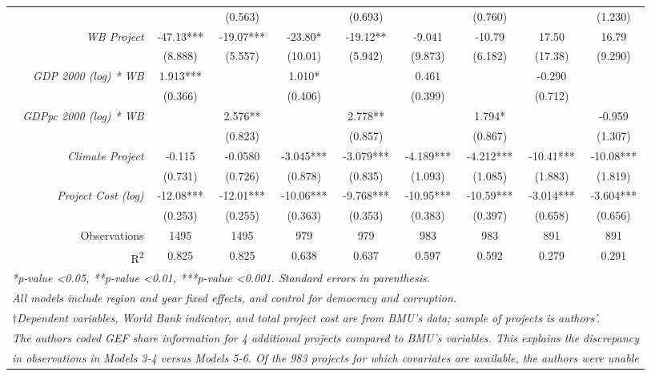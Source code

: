 \documentclass{article}
\begin{document}
\begin{singlespace}
\begin{table}[H]
{\begin{tabular}{rcccccccc}
			\textit{} &  & (0.563) &  & (0.693) &  & (0.760) &  & (1.230) \\
			\textit{WB Project} & -47.13*** & -19.07*** & -23.80* & -19.12** & -9.041 & -10.79 & 17.50 & 16.79 \\
			\textit{} & (8.888) & (5.557) & (10.01) & (5.942) & (9.873) & (6.182) & (17.38) & (9.290) \\
			\textit{GDP 2000 (log) * WB} & 1.913*** &  & 1.010* &  & 0.461 &  & -0.290 &  \\
			\textit{} & (0.366) &  & (0.406) &  & (0.399) &  & (0.712) &  \\
			\textit{GDPpc 2000 (log) * WB} &  & 2.576** &  & 2.778** &  & 1.794* &  & -0.959 \\
			\textit{} &  & (0.823) &  & (0.857) &  & (0.867) &  & (1.307) \\
			\textit{Climate Project} & -0.115 & -0.0580 & -3.045*** & -3.079*** & -4.189*** & -4.212*** & -10.41*** & -10.08*** \\
			\textit{} & (0.731) & (0.726) & (0.878) & (0.835) & (1.093) & (1.085) & (1.883) & (1.819) \\
			\textit{Project Cost (log)} & -12.08*** & -12.01*** & -10.06*** & -9.768*** & -10.95*** & -10.59*** & -3.014*** & -3.604*** \\
			\textit{} & (0.253) & (0.255) & (0.363) & (0.353) & (0.383) & (0.397) & (0.658) & (0.656) \\ \hline
			Observations & 1495 & 1495 & 979 & 979 & 983 & 983 & 891 & 891 \\
			R\textsuperscript{2} & 0.825 & 0.825 & 0.638 & 0.637 & 0.597 & 0.592 & 0.279 & 0.291 \\ \hline
			\multicolumn{9}{l}{\textit{*p-value \textless 0.05, **p-value \textless 0.01, ***p-value \textless 0.001.  Standard errors in parenthesis.}} \\
			\multicolumn{9}{l}{\textit{All models include region and year fixed effects, and control for democracy and corruption.}} \\
			\multicolumn{9}{l}{\textit{$\dagger$Dependent variables, World Bank indicator, and total project cost are from BMU's data; sample of projects is authors'.}} \\
			\multicolumn{9}{l}{\textit{The authors coded GEF share information for 4 additional projects compared to BMU's variables. This explains the discrepancy}} \\
			\multicolumn{9}{l}{\textit{in observations in Models 3-4 versus Models 5-6. Of the 983 projects for which covariates are available, the authors were unable}} \\

\end{tabular}}
\end{table}
\end{singlespace}
\end{document}
